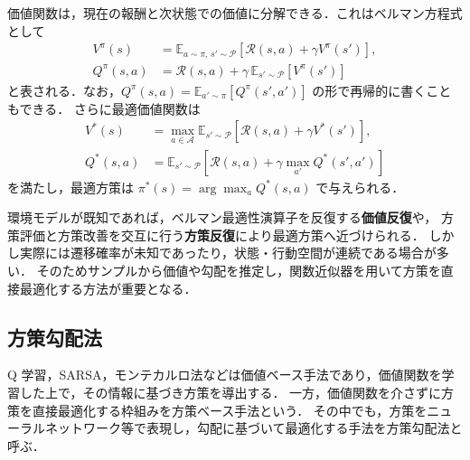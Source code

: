 価値関数は，現在の報酬と次状態での価値に分解できる．これはベルマン方程式として
\begin{align}
  V^\pi(s)
   & =
  \mathbb{E}_{a\sim\pi,\,s'\sim\mathcal{P}}
  \left[\mathcal{R}(s,a)+\gamma V^\pi(s')\right],
  \label{eq:bellman_v} \\
  Q^\pi(s,a)
   & =
  \mathcal{R}(s,a) + \gamma\,\mathbb{E}_{s'\sim\mathcal{P}}
  \left[V^\pi(s')\right]
  \label{eq:bellman_q}
\end{align}
と表される．なお，$Q^\pi(s,a)=\mathbb{E}_{a'\sim\pi}[Q^\pi(s',a')]$ の形で再帰的に書くこともできる．
さらに最適価値関数は
\begin{align}
  V^*(s)
   & =
  \max_{a\in\mathcal{A}}
  \mathbb{E}_{s'\sim\mathcal{P}}
  \left[\mathcal{R}(s,a)+\gamma V^*(s')\right],
  \label{eq:bellman_opt_v} \\
  Q^*(s,a)
   & =
  \mathbb{E}_{s'\sim\mathcal{P}}
  \left[\mathcal{R}(s,a)+\gamma \max_{a'} Q^*(s',a')\right]
  \label{eq:bellman_opt_q}
\end{align}
を満たし，最適方策は $\pi^*(s)=\arg\max_a Q^*(s,a)$ で与えられる．

環境モデルが既知であれば，ベルマン最適性演算子を反復する\textbf{価値反復}や，
方策評価と方策改善を交互に行う\textbf{方策反復}により最適方策へ近づけられる．
しかし実際には遷移確率が未知であったり，状態・行動空間が連続である場合が多い．
そのためサンプルから価値や勾配を推定し，関数近似器を用いて方策を直接最適化する方法が重要となる．

\subsection{方策勾配法}
\label{subsec:PG_theorem}
Q 学習，SARSA，モンテカルロ法などは価値ベース手法であり，価値関数を学習した上で，その情報に基づき方策を導出する．
一方，価値関数を介さずに方策を直接最適化する枠組みを方策ベース手法という．
その中でも，方策をニューラルネットワーク等で表現し，勾配に基づいて最適化する手法を方策勾配法と呼ぶ．


